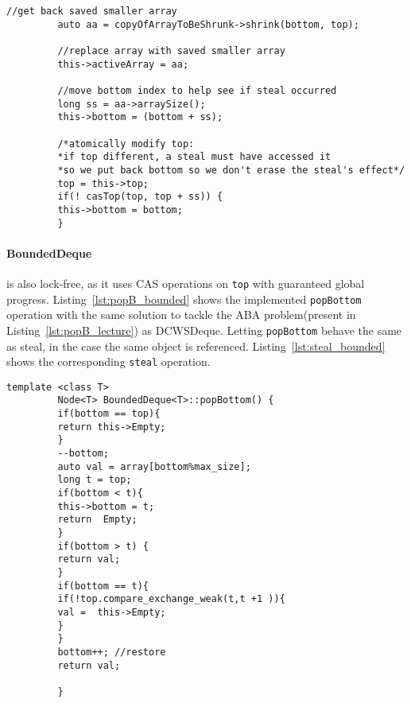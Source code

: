 \documentclass [10pt]{scrartcl}
\begin{document}
   \begin{center}
      \begin{minipage}{.9\textwidth}
         \begin{lstlisting}[caption={\texttt{perhapsShrink}}, label={lst:perhaps_shrink}]
         //get back saved smaller array
         auto aa = copyOfArrayToBeShrunk->shrink(bottom, top);
         
         //replace array with saved smaller array
         this->activeArray = aa;
         
         //move bottom index to help see if steal occurred    
         long ss = aa->arraySize();
         this->bottom = (bottom + ss);
         
         /*atomically modify top: 
         *if top different, a steal must have accessed it
         *so we put back bottom so we don't erase the steal's effect*/
         top = this->top;
         if(! casTop(top, top + ss)) {
         this->bottom = bottom;
         }
         \end{lstlisting}
      \end{minipage}
   \end{center}
   
   
   \paragraph{BoundedDeque} is also lock-free, as it uses CAS operations on \texttt{top} with guaranteed global progress. Listing~\ref{lst:popB_bounded} shows the implemented \texttt{popBottom} operation with the same solution to tackle the ABA problem(present in Listing~\ref{lst:popB_lecture}) as DCWSDeque. Letting \texttt{popBottom} behave the same as steal, in the case the same object is referenced. Listing~\ref{lst:steal_bounded} shows the corresponding \texttt{steal} operation.
   
   \begin{center}
      \begin{minipage}{.9\textwidth}
         \begin{lstlisting}[caption={\texttt{popBottom} uses atomic update to handle concurrent steals of the last element}, label={lst:popB_bounded}]
         template <class T>
         Node<T> BoundedDeque<T>::popBottom() {
         if(bottom == top){
         return this->Empty;
         }
         --bottom;
         auto val = array[bottom%max_size];
         long t = top;
         if(bottom < t){
         this->bottom = t;
         return  Empty;
         }
         if(bottom > t) {
         return val;
         }
         if(bottom == t){
         if(!top.compare_exchange_weak(t,t +1 )){
         val =  this->Empty;
         }
         }
         bottom++; //restore
         return val;
         
         }
         \end{lstlisting}
      \end{minipage}
   \end{center}
   
\end{document}
